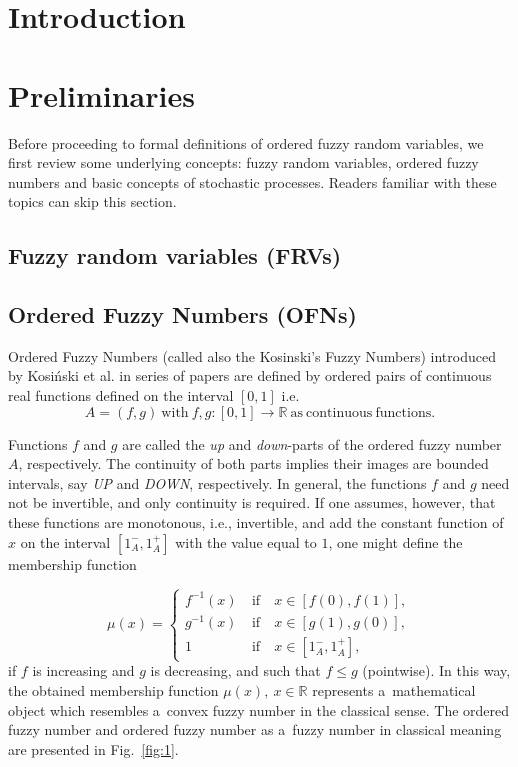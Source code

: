 \documentclass[review]{elsarticle}
\theoremstyle{definition}
\theoremstyle{theorem}
\begin{document}
\section{Introduction}



\section{Preliminaries}
Before proceeding to formal definitions of ordered fuzzy random variables, we first review some underlying concepts: fuzzy random variables, ordered fuzzy numbers and basic concepts of stochastic processes. Readers familiar with these topics can skip this section.

\subsection{Fuzzy random variables (FRVs)}
\label{sec:frv}

\subsection{Ordered Fuzzy Numbers (OFNs)}
Ordered Fuzzy Numbers (called also the Kosinski's Fuzzy Numbers) introduced by Kosi\'nski et al. in series of papers \cite{kos2002,kos2003a,kos2003b,kos2004,kos2006} are defined by ordered pairs of continuous real functions defined on the interval $[0,1]$ i.e.
\begin{equation}
A=(f,g)\ \mathrm{with}\ f,g\colon[0,1]\to\mathbb{R}\ \mathrm{as\ continuous\ functions}. 
\end{equation} 

Functions $f$ and $g$ are called the \emph{up} and \emph{down}-parts of the ordered fuzzy number $A$, respectively. The continuity of both parts implies their images are bounded intervals, say \emph{UP} and \emph{DOWN}, respectively. In general, the functions $f$ and $g$ need not be invertible, and only continuity is required. If one assumes, however, that these functions are monotonous, i.e., invertible, and add the constant function of $x$ on the interval $[1_A^-,1_A^+]$ with the value equal to $1$, one might define the membership function

\begin{equation}
\label{eq:1}
\mu(x)=\left\{
\begin{array}{ccl}
f^{-1}(x) &\ \mathrm{ if }\ & x\in[f(0),f(1)],\\
g^{-1}(x) &\ \mathrm{ if }\ & x\in[g(1),g(0)],\\
1&\ \mathrm{ if }\ &x\in[1_A^-,1_A^+],
\end{array}
\right.
\end{equation}
if $f$ is increasing and $g$ is decreasing, and such that $f\leq g$ (pointwise). In this way, the obtained membership function $\mu(x),\ x\in\mathbb{R}$ represents a~mathematical object which resembles a~convex fuzzy number in the classical sense. The ordered fuzzy number and ordered fuzzy number as a~fuzzy number in classical meaning are presented in Fig.~\ref{fig:1}.
\end{document}
